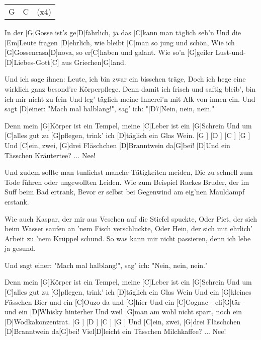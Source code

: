 

\begin{guitar}
	 {\footnotesize\begin{tabular}{l|l|l}
			G & C & (x4)
	\end{tabular}}
	In der [G]Gosse ist's ge[D]fährlich, ja das [C]kann man täglich seh'n
	Und die [Em]Leute fragen [D]ehrlich, wie bleibt [C]man so jung und schön,
	Wie ich [G]Gossencasa[D]nova, so er[C]haben und galant.
	Wie so'n [G]geiler Lust-und-[D]Liebes-Gott[C] aus Griechen[G]land.
	
	Und ich sage ihnen: Leute, ich bin zwar ein bisschen träge,
	Doch ich hege eine wirklich ganz besond're Körperpflege.
	Denn damit ich frisch und saftig bleib', bin ich mir nicht zu fein
	Und leg' täglich meine Innerei'n mit Alk von innen ein.
	Und sagt [D]einer: "Mach mal halblang!", sag' ich: "[D7]Nein, nein, nein."
	
	Denn mein [G]Körper ist ein Tempel, meine [C]Leber ist ein [G]Schrein
	Und um [C]alles gut zu [G]pflegen, trink' ich [D]täglich ein Glas Wein.
	[G ] [D ] [C ] [G ] Und [C]ein, zwei, [G]drei Fläschchen [D]Branntwein da[G]bei!
	[D]Und ein Tässchen Kräutertee? ... Nee!
	
	Und zudem sollte man tunlichst manche Tätigkeiten meiden,
	Die zu schnell zum Tode führen oder ungewollten Leiden.
	Wie zum Beispiel Rackes Bruder, der im Suff beim Bad ertrank,
	Bevor er selbst bei Gegenwind am eig'nen Mauldampf erstank.
	
	Wie auch Kaspar, der mir aus Vesehen auf die Stiefel spuckte,
	Oder Piet, der sich beim Wasser saufen an 'nem Fisch verschluckte,
	Oder Hein, der sich mit ehrlich' Arbeit zu 'nem Krüppel schund.
	So was kann mir nicht passieren, denn ich lebe ja gesund.
	
	Und sagt einer: "Mach mal halblang!", sag' ich: "Nein, nein, nein."
	
	Denn mein [G]Körper ist ein Tempel, meine [C]Leber ist ein [G]Schrein
	Und um [C]alles gut zu [G]pflegen, trink' ich [D]täglich ein Glas Wein
	Und ein [G]kleines Fässchen Bier und ein [C]Ouzo da und [G]hier
	Und ein [C]Cognac - eli[G]tär - und ein [D]Whisky hinterher
	Und weil [G]man am wohl nicht spart, noch ein [D]Wodkakonzentrat.
	[G ] [D ] [C ] [G ] Und [C]ein, zwei, [G]drei Fläschchen [D]Branntwein da[G]bei!
	Viel[D]leicht ein Tässchen Milchkaffee? ... Nee!
	

\end{guitar}

